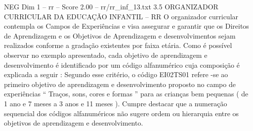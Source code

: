 \begin{textsample}{NEG Dim 1 – rr – Score 2.00 – rr/rr\_inf\_13.txt}  \label{ex:f1_neg_074}
3.5 ORGANIZADOR CURRICULAR DA EDUCAÇÃO INFANTIL – RR O organizador curricular contempla os Campos de Experiências e visa assegurar e garantir que os Direitos de Aprendizagem e os Objetivos de Aprendizagem e desenvolvimentos sejam realizados conforme a gradação existentes por faixa etária.
Como é possível observar no exemplo apresentado, cada objetivo de aprendizagem e desenvolvimento é identificado por um código alfanumérico cuja composição é explicada a seguir : Segundo esse critério, o código EI02TS01 refere -se ao primeiro objetivo de aprendizagem e desenvolvimento proposto no campo de experiências “ Traços, sons, cores e formas ” para as crianças bem pequenas ( de 1 ano e 7 meses a 3 anos e 11 meses ).
Cumpre destacar que a numeração sequencial dos códigos alfanuméricos não sugere ordem ou hierarquia entre os objetivos de aprendizagem e desenvolvimento.

\end{textsample}
